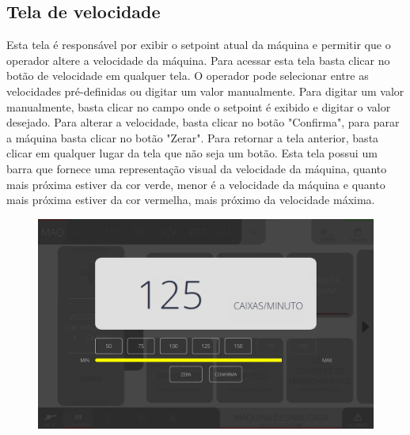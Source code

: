 \pagestyle{fancy}
\vspace*{40 pt}

\subsection{Tela de velocidade}
    Esta tela é responsável por exibir o setpoint atual da máquina e permitir que o operador altere a velocidade da máquina. Para acessar esta tela
    basta clicar no botão de velocidade em qualquer tela. O operador pode selecionar entre as velocidades pré-definidas ou digitar um valor manualmente.
    Para digitar um valor manualmente, basta clicar no campo onde o setpoint é exibido e digitar o valor desejado. Para alterar a velocidade, basta clicar no botão "Confirma",
    para parar a máquina basta clicar no botão "Zerar". Para retornar a tela anterior, basta clicar em qualquer lugar da tela que não seja um botão. Esta tela possui um 
    barra que fornece uma representação visual da velocidade da máquina, quanto mais próxima estiver da cor verde, menor é a velocidade da máquina e quanto mais próxima
    estiver da cor vermelha, mais próximo da velocidade máxima.
    \vspace*{\fill}
    \begin{figure}[h]
      \centering
      \includegraphics[width=576 px,height=360 px]{src/imagesICV/14-speedScreen/1.png}
    \end{figure}
    \vspace*{\fill}
    
    
    